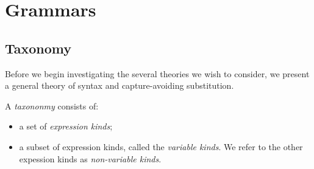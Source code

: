 \section{Grammars}

\subsection{Taxonomy}


Before we begin investigating the several theories we wish to consider, we present a general theory of syntax and
capture-avoiding substitution.

A \emph{taxononmy} consists of:
\begin{itemize}
\item a set of \emph{expression kinds};
\item a subset of expression kinds, called the \emph{variable kinds}.  We refer to the other expession kinds as \emph{non-variable kinds}.
\end{itemize}

\begin{code}%
\>  \AgdaSymbol{:}  \<%
\\
\>[0]\<[2]%
\>[2]\<%
\\
\>[2]\<[4]%
\>[4] \AgdaSymbol{:} \<%
\\
\>[2]\<[4]%
\>[4] \AgdaSymbol{:} \<%
\\
%
\\
\>[0]\<[2]%
\>[2]  \AgdaSymbol{:}  \<%
\\
\>[2]\<[4]%
\>[4] \AgdaSymbol{:}   \<%
\\
\>[2]\<[4]%
\>[4] \AgdaSymbol{:}   \<%
\end{code}

